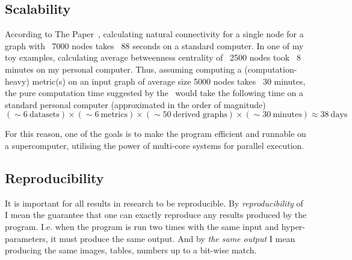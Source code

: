 \subsection{Scalability}

According to The Paper~\cite{Bozhilova2019}, calculating natural connectivity for a single node for a graph with ~7000 nodes takes ~88 seconds on a standard computer.
In one of my toy examples, calculating average betweenness centrality of ~2500 nodes took ~8 minutes on my personal computer.
Thus, assuming computing a (computation-heavy) metric(s) on an input graph of average size 5000 nodes takes ~30 minutes, the pure computation time suggested by the~ would take the following time on a standard personal computer (approximated in the order of magnitude)
\[(\sim 6\ \text{datasets}) \times (\sim 6\ \text{metrics}) \times (\sim 50\ \text{derived graphs}) \times (\sim 30\ \text{minutes}) \approx 38\ \text{days}\]

For this reason, one of the goals is to make the program efficient and runnable on a supercomputer, utilising the power of multi-core systems for parallel execution.

\subsection{Reproducibility}

It is important for all results in research to be reproducible.
By \textsl{reproducibility} of \graffs I mean the guarantee that one can exactly reproduce any results produced by the program.
I.e. when the program is run two times with the same input and hyper-parameters, it must produce the same output.
And by \textsl{the same output} I mean producing the same images, tables, numbers up to a bit-wise match.

